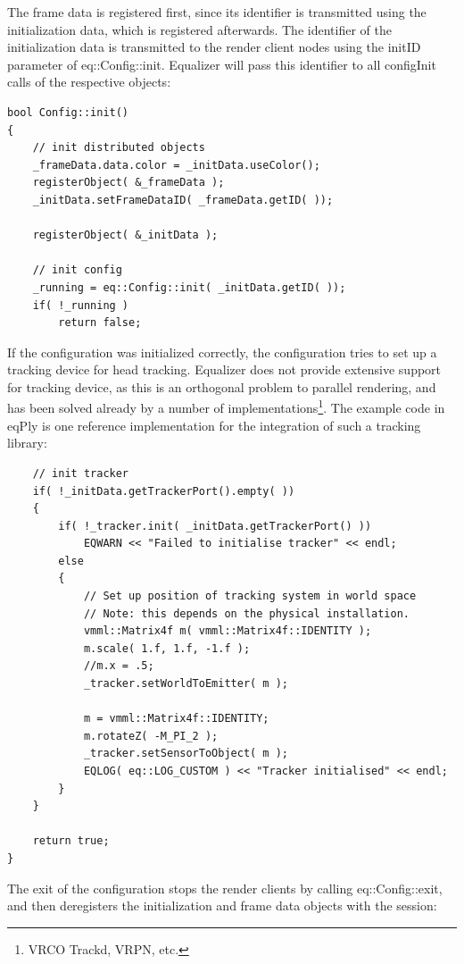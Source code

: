 \documentclass[10pt,a4]{scrartcl}
\begin{document}
The frame data is registered first, since its identifier is transmitted
using the initialization data, which is registered afterwards. The
identifier of the initialization data is transmitted to the render
client nodes using the \textsf{initID} parameter of
\textsf{eq::Config::init}. Equalizer will pass this identifier to all
\textsf{configInit} calls of the respective objects:

{\footnotesize\begin{lstlisting}
bool Config::init()
{
    // init distributed objects
    _frameData.data.color = _initData.useColor();
    registerObject( &_frameData );
    _initData.setFrameDataID( _frameData.getID( ));

    registerObject( &_initData );

    // init config
    _running = eq::Config::init( _initData.getID( ));
    if( !_running )
        return false;
\end{lstlisting}}

If the configuration was initialized correctly, the configuration tries
to set up a tracking device for head tracking. Equalizer does not
provide extensive support for tracking device, as this is an orthogonal
problem to parallel rendering, and has been solved already by a number
of implementations\footnote{VRCO Trackd, VRPN, etc.}. The example
code in \textsf{eqPly} is one reference implementation for the
integration of such a tracking library:

{\footnotesize\begin{lstlisting}
    // init tracker
    if( !_initData.getTrackerPort().empty( ))
    {
        if( !_tracker.init( _initData.getTrackerPort() ))
            EQWARN << "Failed to initialise tracker" << endl;
        else
        {
            // Set up position of tracking system in world space
            // Note: this depends on the physical installation.
            vmml::Matrix4f m( vmml::Matrix4f::IDENTITY );
            m.scale( 1.f, 1.f, -1.f );
            //m.x = .5;
            _tracker.setWorldToEmitter( m );

            m = vmml::Matrix4f::IDENTITY;
            m.rotateZ( -M_PI_2 );
            _tracker.setSensorToObject( m );
            EQLOG( eq::LOG_CUSTOM ) << "Tracker initialised" << endl;
        }
    }

    return true;
}
\end{lstlisting}}%

The exit of the configuration stops the render clients by calling
\textsf{eq::Config::exit}, and then deregisters the initialization and
frame data objects with the session:
\end{document}
